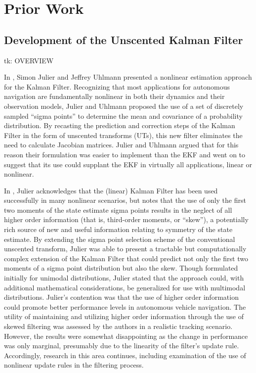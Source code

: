 \chapter{Prior Work}

\section{Development of the Unscented Kalman Filter}

tk: OVERVIEW

In \cite{Julier1997}, Simon Julier and Jeffrey Uhlmann presented a nonlinear estimation approach for the Kalman Filter. Recognizing that most applications for autonomous navigation are fundamentally nonlinear in both their dynamics and their observation models, Julier and Uhlmann proposed the use of a set of discretely sampled ``sigma points'' to determine the mean and covariance of a probability distribution. By recasting the prediction and correction steps of the Kalman Filter in the form of unscented transforms (UTs), this new filter eliminates the need to calculate Jacobian matrices. Julier and Uhlmann argued that for this reason their formulation was easier to implement than the EKF and went on to suggest that its use could supplant the EKF in virtually all applications, linear or nonlinear.

In \cite{Julier1998}, Julier acknowledges that the (linear) Kalman Filter has been used successfully in many nonlinear scenarios, but notes that the use of only the first two moments of the state estimate sigma points results in the neglect of all higher order information (that is, third-order moments, or ``skew''), a potentially rich source of new and useful information relating to symmetry of the state estimate. By extending the sigma point selection scheme of the conventional unscented transform, Julier was able to present a tractable but computationally complex extension of the Kalman Filter that could predict not only the first two moments of a sigma point distribution but also the skew. Though formulated initially for unimodal distributions, Julier stated that the approach could, with additional mathematical considerations, be generalized for use with multimodal distributions. Julier's contention was that the use of higher order information could promote better performance levels in autonomous vehicle navigation. The utility of maintaining and utilizing higher order information through the use of skewed filtering was assessed by the authors in a realistic tracking scenario. However, the results were somewhat disappointing as the change in performance was only marginal, presumably due to the linearity of the filter's update rule. Accordingly, research in this area continues, including examination of the use of nonlinear update rules in the filtering process.

